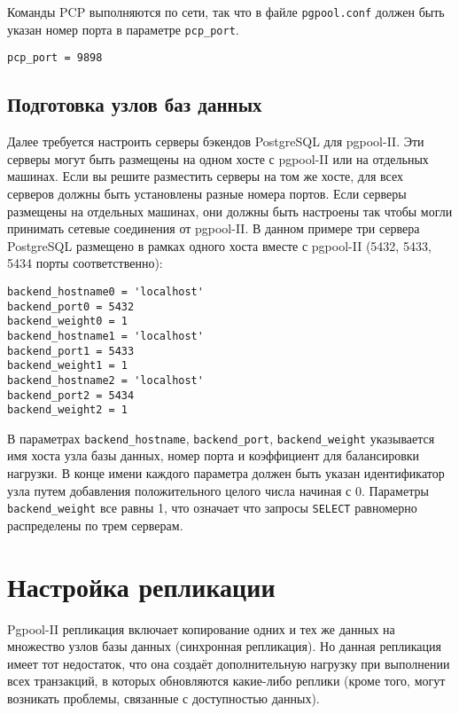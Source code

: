 Команды PCP выполняются по сети, так что в файле \lstinline!pgpool.conf! должен быть указан номер порта в параметре \lstinline!pcp_port!.

\begin{lstlisting}[label=lst:pgpool9,caption=Настройка команд PCP]
pcp_port = 9898
\end{lstlisting}


\subsection{Подготовка узлов баз данных}

Далее требуется настроить серверы бэкендов PostgreSQL для pgpool-II. Эти серверы могут быть размещены на одном хосте с pgpool-II или на отдельных машинах. Если вы решите разместить серверы на том же хосте, для всех серверов должны быть установлены разные номера портов. Если серверы размещены на отдельных машинах, они должны быть настроены так чтобы могли принимать сетевые соединения от pgpool-II. В данном примере три сервера PostgreSQL размещено в рамках одного хоста вместе с pgpool-II (5432, 5433, 5434 порты соответственно):

\begin{lstlisting}[label=lst:pgpool10,caption=Подготовка узлов баз данных]
backend_hostname0 = 'localhost'
backend_port0 = 5432
backend_weight0 = 1
backend_hostname1 = 'localhost'
backend_port1 = 5433
backend_weight1 = 1
backend_hostname2 = 'localhost'
backend_port2 = 5434
backend_weight2 = 1
\end{lstlisting}

В параметрах \lstinline!backend_hostname!, \lstinline!backend_port!, \lstinline!backend_weight! указывается имя хоста узла базы данных, номер порта и коэффициент для балансировки нагрузки. В конце имени каждого параметра должен быть указан идентификатор узла путем добавления положительного целого числа начиная с 0. Параметры \lstinline!backend_weight! все равны 1, что означает что запросы \lstinline!SELECT! равномерно распределены по трем серверам.

\section{Настройка репликации}
\label{sec:pgpool-II-replica}

Pgpool-II репликация включает копирование одних и тех же данных на множество узлов базы данных (синхронная репликация). Но данная репликация имеет тот недостаток, что она создаёт дополнительную нагрузку при выполнении всех транзакций, в которых обновляются какие-либо реплики (кроме того, могут возникать проблемы, связанные с доступностью данных).


